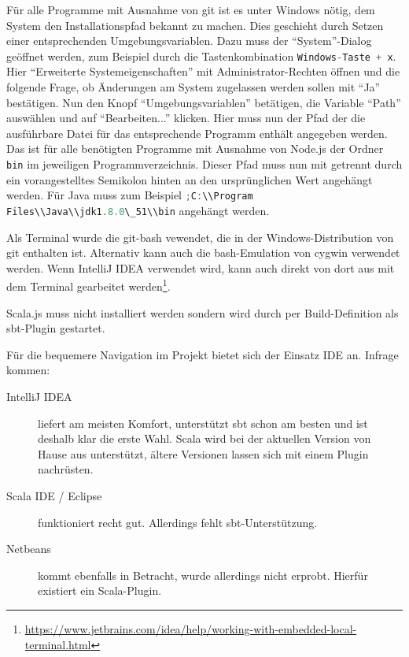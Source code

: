 \documentclass[a4paper, 12pt, hidelinks, listof=totoc, listoftables=totoc, bibliography=totoc]{scrreprt}
\newcommand{\code}[1]{\lstinline[language=Scala, style=inline]|#1|}
\begin{document}
Für alle Programme mit Ausnahme von git ist es unter Windows nötig, dem System den Installationspfad bekannt zu machen. Dies geschieht durch Setzen einer entsprechenden Umgebungsvariablen. Dazu muss der "`System"'-Dialog geöffnet werden, zum Beispiel durch die Tastenkombination \code{Windows-Taste + x}. Hier "`Erweiterte Systemeigenschaften"' mit Administrator-Rechten öffnen und die folgende Frage, ob Änderungen am System zugelassen werden sollen mit "`Ja"' bestätigen. Nun den Knopf "`Umgebungsvariablen"' betätigen, die Variable "`Path"' auswählen und auf "`Bearbeiten..."' klicken. Hier muss nun der Pfad der die ausführbare Datei für das entsprechende Programm enthält angegeben werden. Das ist für alle benötigten Programme mit Ausnahme von Node.js der Ordner \code{bin} im jeweiligen Programmverzeichnis. Dieser Pfad muss nun mit getrennt durch ein vorangestelltes Semikolon hinten an den ursprünglichen Wert angehängt werden. Für Java muss zum Beispiel \code{;C:\\Program Files\\Java\\jdk1.8.0\_51\\bin} angehängt werden.

Als Terminal wurde die git-bash vewendet, die in der Windows-Distribution von git enthalten ist. Alternativ kann auch die bash-Emulation von cygwin verwendet werden. Wenn IntelliJ IDEA verwendet wird, kann auch direkt von dort aus mit dem Terminal gearbeitet werden\footnote{\url{https://www.jetbrains.com/idea/help/working-with-embedded-local-terminal.html}}.

Scala.js muss nicht installiert werden sondern wird durch per Build-Definition als sbt-Plugin gestartet.

Für die bequemere Navigation im Projekt bietet sich der Einsatz IDE an. Infrage kommen:

\begin{description}
	\item[IntelliJ IDEA] liefert am meisten Komfort, unterstützt sbt schon am besten und ist deshalb klar die erste Wahl. Scala wird bei der aktuellen Version von Hause aus unterstützt, ältere Versionen lassen sich mit einem Plugin nachrüsten.
	\item[Scala IDE / Eclipse] funktioniert recht gut. Allerdings fehlt sbt-Unterstützung.
	\item[Netbeans] kommt ebenfalls in Betracht, wurde allerdings nicht erprobt. Hierfür existiert ein Scala-Plugin.
\end{description}
\end{document}
